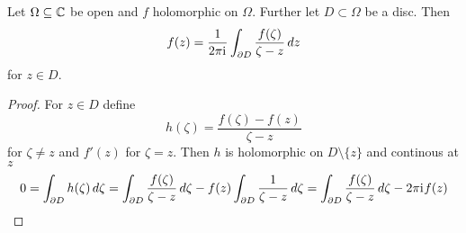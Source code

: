 \begin{theorem}
Let \( \Omega \subseteq \mathbb{C} \) be open and \( f \) holomorphic on \( \Omega \). Further let \( D \subset \Omega \) 
be a disc. Then
	\[
		f(z) = \frac{1}{2\pi\iu} \int_{\boundary D} \frac{f(\zeta)}{\zeta - z}\,dz%
	\]
for \( z \in D \).
\end{theorem}

\begin{proof}
For \( z \in D \) define
\[
	h(\zeta) = \frac{f(\zeta)- f(z)}{\zeta - z} %
\]
for \( \zeta \ne z \) and \( f'(z)  \) for \( \zeta = z \). Then \( h \) is holomorphic on \( D \setminus \{ z \} \) and
continous at \( z \)
\[
	0 = \int_{\partial D} h(\zeta) \,d\zeta 
		= \int_{\partial D} \frac{f(\zeta)}{\zeta - z}\,d\zeta - f(z)\int_{\partial D} \frac{1}{\zeta - z}\,d\zeta
		= \int_{\partial D} \frac{f(\zeta)}{\zeta - z}\,d\zeta - 2\pi\mathrm{i}\mkern1mu f(z)
\]
\end{proof}
\bigskip

